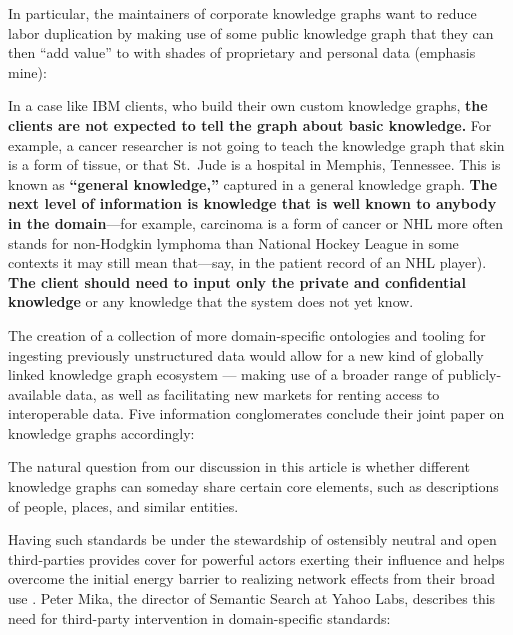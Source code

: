 \documentclass{article}
\renewenvironment{leftbar}
{\vspace{6pt}\def\FrameCommand{\hspace{0em}\vrule width 0.5pt \hspace{1em}}\MakeFramed {\advance\hsize-\width \FrameRestore}}
{\endMakeFramed}
\begin{document}
In particular, the maintainers of corporate knowledge graphs want to
reduce labor duplication by making use of some public knowledge graph
that they can then ``add value'' to with shades of proprietary and
personal data (emphasis mine):

\begin{leftbar}
In a case like IBM clients, who build their own custom knowledge graphs,
\textbf{the clients are not expected to tell the graph about basic
knowledge.} For example, a cancer researcher is not going to teach the
knowledge graph that skin is a form of tissue, or that St.~Jude is a
hospital in Memphis, Tennessee. This is known as \textbf{``general
knowledge,''} captured in a general knowledge graph. \textbf{The next
level of information is knowledge that is well known to anybody in the
domain}---for example, carcinoma is a form of cancer or NHL more often
stands for non-Hodgkin lymphoma than National Hockey League in some
contexts it may still mean that---say, in the patient record of an NHL
player). \textbf{The client should need to input only the private and
confidential knowledge} or any knowledge that the system does not yet
know. \cite{noyIndustryscaleKnowledgeGraphs2019} 
\end{leftbar}

The creation of a collection of more domain-specific ontologies and
tooling for ingesting previously unstructured data would allow for a new
kind of globally linked knowledge graph ecosystem --- making use of a
broader range of publicly-available data, as well as facilitating new
markets for renting access to interoperable data. Five information
conglomerates conclude their joint paper on knowledge graphs
accordingly:

\begin{leftbar}
The natural question from our discussion in this article is whether
different knowledge graphs can someday share certain core elements, such
as descriptions of people, places, and similar entities. \cite{noyIndustryscaleKnowledgeGraphs2019} 
\end{leftbar}

Having such standards be under the stewardship of ostensibly neutral and
open third-parties provides cover for powerful actors exerting their
influence and helps overcome the initial energy barrier to realizing
network effects from their broad use \cite{wiegmannMultiModeStandardisationCritical2017, heiresInternationalOrganizationStandardization2008} . Peter Mika, the
director of Semantic Search at Yahoo Labs, describes this need for
third-party intervention in domain-specific standards:
\end{document}
